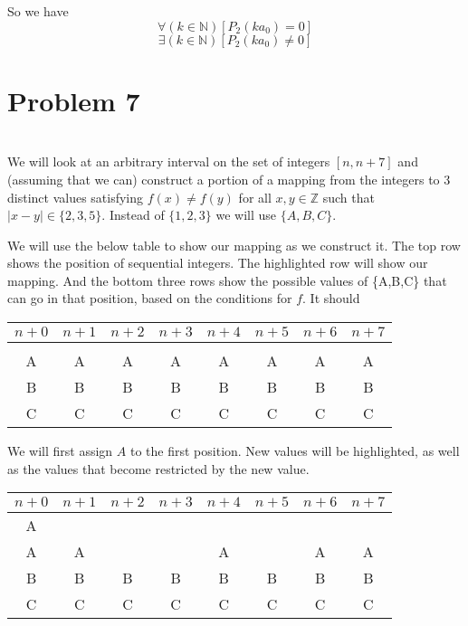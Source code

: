 \documentclass[12pt]{article}
\begin{document}
So we have 
\[\forall(k \in \mathbb{N})[P_2(ka_0) = 0]\]
\[\exists (k \in \mathbb{N})[P_2(ka_0) \ne 0]\]


\newpage
\section*{Problem 7}
\\

We will look at an arbitrary interval on the set of integers $[n, n+7]$ and (assuming that we can) construct a portion of a mapping from the integers to 3 distinct values satisfying $f(x) \ne f(y)$ for all $x,y \in \mathbb{Z}$ such that $\left|x - y\right| \in \{2,3,5\}$. Instead of $\{1,2,3\}$ we will use $\{A,B,C\}$. 

We will use the below table to show our mapping as we construct it. The top row shows the position of sequential integers. The highlighted row will show our mapping. And the bottom three rows show the possible values of \{A,B,C\} that can go in that position, based on the conditions for $f$. It should 


\begin{center}
    \begin{tabular}{|c|c|c|c|c|c|c|c|}
        \hline
        $n+0$ & $n+1$ & $n+2$ & $n+3$ & $n+4$ & $n+5$ & $n+6$ & $n+7$ \\
        \hline
        \rowcolor[RGB]{200, 200, 200}
         & & & & & & & \\
        \hline
        A & A & A & A & A & A & A & A \\
        \hline
        B & B & B & B & B & B & B & B \\
        \hline
        C & C & C & C & C & C & C & C \\
        \hline
    \end{tabular}
\end{center}

We will first assign $A$ to the first position. New values will be highlighted, as well as the values that become restricted by the new value.
\begin{center}
    \begin{tabular}{|c|c|c|c|c|c|c|c|}
        \hline
        $n+0$ & $n+1$ & $n+2$ & $n+3$ & $n+4$ & $n+5$ & $n+6$ & $n+7$ \\
        \hline
        \rowcolor[RGB]{200, 200, 200}
        \cellcolor{gray!70}A & & & & & & & \\
        \hline
        A & A & \cellcolor{gray!15} & \cellcolor{gray!15} & A & \cellcolor{gray!15} & A & A \\
        \hline
        B & B & B & B & B & B & B & B \\
        \hline
        C & C & C & C & C & C & C & C \\
        \hline
    \end{tabular}
\end{center}
\end{document}
